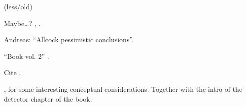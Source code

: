 \cite{ComplexAbsPot}

\cite{Werner_ArrivalTime} (less/old)

Maybe\dots? \cite{ProbCurrent}, \cite{Ruschhaupt_QMoT}.

Andreas: ``Allcock pessimistic conclusions''.

``Book vol. 2'' \cite{TQM2:Detector}.

Cite \cite{Muga_ArrTimeOpNormal, Damborenea, Sudarshan_Zeno, Echanobe, Savvidou-1, Savvidou-2}.

\cite{Damborenea_atomic}, for some interesting conceptual considerations. Together with the
intro of the detector chapter of the book.